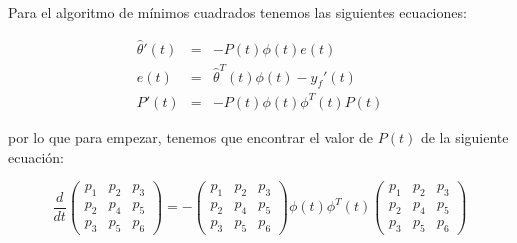                 Para el algoritmo de mínimos cuadrados tenemos las siguientes ecuaciones:

                \begin{eqnarray}
                    \hat{\theta}'(t) & = & - P(t) \phi(t) e(t) \\
                    e(t) & = & \hat{\theta}^T(t) \phi(t) - y_f'(t) \\
                    P'(t) & = & - P(t) \phi(t) \phi^T(t) P(t)
                \end{eqnarray}

                por lo que para empezar, tenemos que encontrar el valor de $P(t)$ de la siguiente ecuación:

                \begin{equation*}
                    \frac{d}{dt}
                    \begin{pmatrix}
                        p_1 & p_2 & p_3 \\
                        p_2 & p_4 & p_5 \\
                        p_3 & p_5 & p_6
                    \end{pmatrix} = -
                    \begin{pmatrix}
                        p_1 & p_2 & p_3 \\
                        p_2 & p_4 & p_5 \\
                        p_3 & p_5 & p_6
                    \end{pmatrix} \phi(t) \phi^T(t)
                    \begin{pmatrix}
                        p_1 & p_2 & p_3 \\
                        p_2 & p_4 & p_5 \\
                        p_3 & p_5 & p_6
                    \end{pmatrix}
                \end{equation*}

